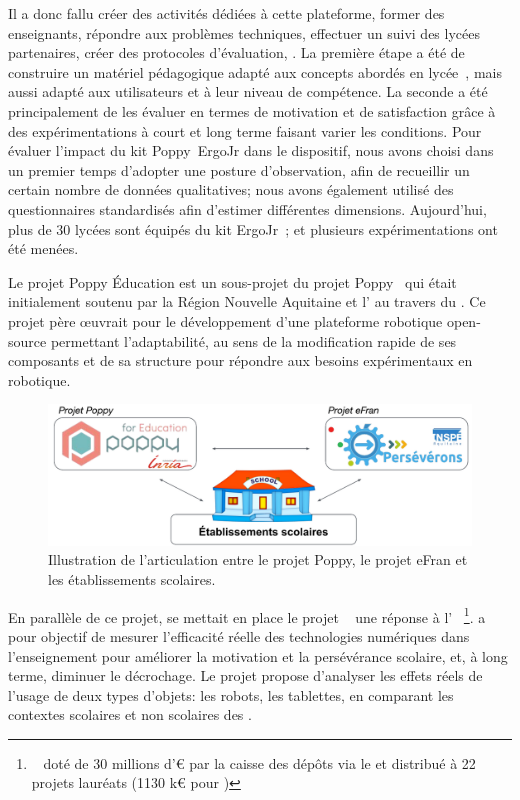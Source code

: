     Il a donc fallu créer des activités dédiées à cette plateforme, former des enseignants, répondre aux problèmes techniques, effectuer un suivi des lycées partenaires, créer des protocoles d'évaluation, \etc. La première étape a été de construire un matériel pédagogique adapté aux concepts abordés en lycée~, mais aussi adapté aux utilisateurs et à leur niveau de compétence. La seconde a été principalement de les évaluer en termes de motivation et de satisfaction grâce à des expérimentations à court et long terme faisant varier les conditions.
    Pour évaluer l’impact du kit Poppy~ErgoJr dans le dispositif, nous avons choisi dans un premier temps d'adopter une posture d'observation, afin de recueillir un certain nombre de données qualitatives; nous avons également utilisé des questionnaires standardisés afin d'estimer différentes dimensions.
    Aujourd'hui, plus de 30 lycées sont équipés du kit ErgoJr~; et plusieurs expérimentations ont été menées.\par%
    Le projet Poppy Éducation est un sous-projet du projet Poppy~ qui était initialement soutenu par la Région Nouvelle Aquitaine et l' au travers du . Ce projet père œuvrait pour le développement d'une plateforme robotique open-source permettant l'adaptabilité, au sens de la modification rapide de ses composants et de sa structure pour répondre aux besoins expérimentaux en robotique.
    \begin{figure}[!h]
        \centering
        \includegraphics[width=\linewidth]{Figures/Desprez-projet.pdf}
        \caption[Illustration, articulation projet Poppy, eFran et établissements scolaires]{Illustration de l'articulation entre le projet Poppy, le projet eFran et les établissements scolaires.}
        \label{fig:projet}
    \end{figure}\par%
    En parallèle de ce projet, se mettait en place le projet ~ une réponse à l' ~\footnote{ ~ doté de 30 millions d'\euro{} par la caisse des dépôts via le  et distribué à 22 projets lauréats (1130 k\euro{} pour )}.  a pour objectif de mesurer l’efficacité réelle des technologies numériques dans l’enseignement pour améliorer la motivation et la persévérance scolaire, et, à long terme, diminuer le décrochage. Le projet propose d’analyser les effets réels de l’usage de deux types d’objets: les robots, les tablettes, en comparant les contextes scolaires et non scolaires des . 

